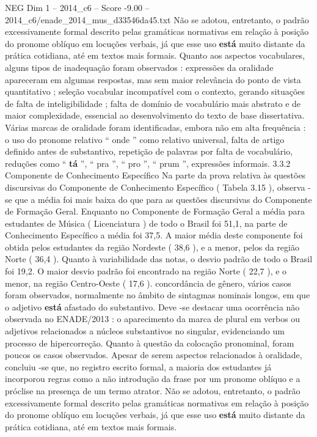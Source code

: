 \begin{textsample}{NEG Dim 1 – 2014\_c6 – Score -9.00 – 2014\_c6/enade\_2014\_mus\_d33546da45.txt}
Não se adotou, entretanto, o padrão excessivamente formal descrito pelas gramáticas normativas em relação à posição do pronome oblíquo em locuções verbais, já que esse uso \textbf{está} muito distante da prática cotidiana, até em textos mais formais.
Quanto aos aspectos vocabulares, alguns tipos de inadequação foram observados : expressões da oralidade apareceram em algumas respostas, mas sem maior relevância do ponto de vista quantitativo ; seleção vocabular incompatível com o contexto, gerando situações de falta de inteligibilidade ; falta de domínio de vocabulário mais abstrato e de maior complexidade, essencial ao desenvolvimento do texto de base dissertativa.
Várias marcas de oralidade foram identificadas, embora não em alta frequência : o uso do pronome relativo “ onde ” como relativo universal, falta de artigo definido antes de substantivo, repetição de palavras por falta de vocabulário, reduções como “ \textbf{tá} ”, “ pra ”, “ pro ”, “ prum ”, expressões informais. 3.3.2 Componente de Conhecimento Específico Na parte da prova relativa às questões discursivas do Componente de Conhecimento Específico ( Tabela 3.15 ), observa -se que a média foi mais baixa do que para as questões discursivas do Componente de Formação Geral.
Enquanto no Componente de Formação Geral a média para estudantes de Música ( Licenciatura ) de todo o Brasil foi 51,1, na parte de Conhecimento Específico a média foi 37,5.
A maior média deste componente foi obtida pelos estudantes da região Nordeste ( 38,6 ), e a menor, pelos da região Norte ( 36,4 ).
Quanto à variabilidade das notas, o desvio padrão de todo o Brasil foi 19,2.
O maior desvio padrão foi encontrado na região Norte ( 22,7 ), e o menor, na região Centro-Oeste ( 17,6 ). concordância de gênero, vários casos foram observados, normalmente no âmbito de sintagmas nominais longos, em que o adjetivo \textbf{está} afastado do substantivo.
Deve -se destacar uma ocorrência não observada no ENADE/2013 : o aparecimento da marca de plural em verbos ou adjetivos relacionados a núcleos substantivos no singular, evidenciando um processo de hipercorreção.
Quanto à questão da colocação pronominal, foram poucos os casos observados.
Apesar de serem aspectos relacionados à oralidade, concluiu -se que, no registro escrito formal, a maioria dos estudantes já incorporou regras como a não introdução da frase por um pronome oblíquo e a próclise na presença de um termo atrator.
Não se adotou, entretanto, o padrão excessivamente formal descrito pelas gramáticas normativas em relação à posição do pronome oblíquo em locuções verbais, já que esse uso \textbf{está} muito distante da prática cotidiana, até em textos mais formais.

\end{textsample}
